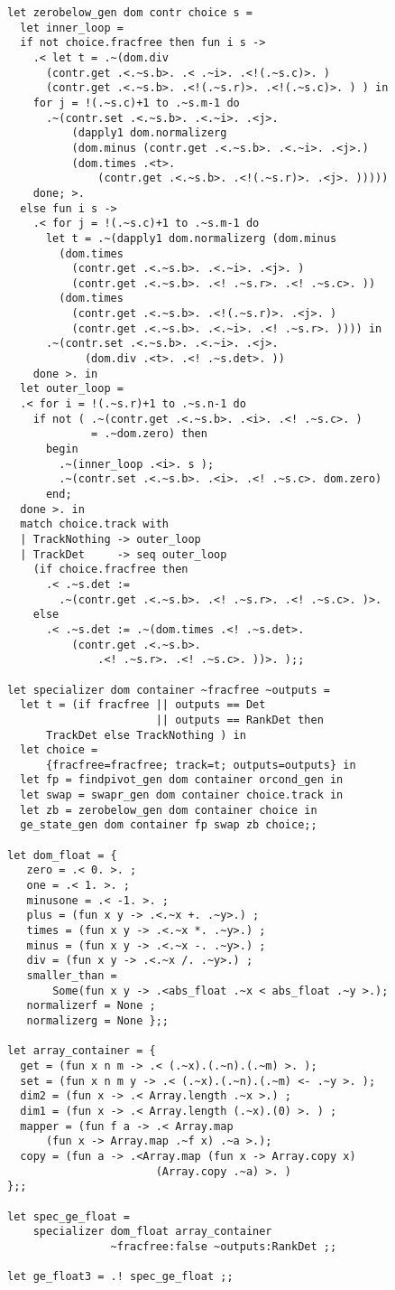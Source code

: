 \documentclass[11pt]{elsart}
\begin{document}
\begin{small}
\begin{verbatim}
let zerobelow_gen dom contr choice s =
  let inner_loop = 
  if not choice.fracfree then fun i s ->
    .< let t = .~(dom.div 
      (contr.get .<.~s.b>. .< .~i>. .<!(.~s.c)>. )
      (contr.get .<.~s.b>. .<!(.~s.r)>. .<!(.~s.c)>. ) ) in
    for j = !(.~s.c)+1 to .~s.m-1 do
      .~(contr.set .<.~s.b>. .<.~i>. .<j>. 
          (dapply1 dom.normalizerg 
          (dom.minus (contr.get .<.~s.b>. .<.~i>. .<j>.)
          (dom.times .<t>. 
              (contr.get .<.~s.b>. .<!(.~s.r)>. .<j>. )))))
    done; >.
  else fun i s -> 
    .< for j = !(.~s.c)+1 to .~s.m-1 do
      let t = .~(dapply1 dom.normalizerg (dom.minus 
        (dom.times 
          (contr.get .<.~s.b>. .<.~i>. .<j>. )
          (contr.get .<.~s.b>. .<! .~s.r>. .<! .~s.c>. ))
        (dom.times 
          (contr.get .<.~s.b>. .<!(.~s.r)>. .<j>. )
          (contr.get .<.~s.b>. .<.~i>. .<! .~s.r>. )))) in
      .~(contr.set .<.~s.b>. .<.~i>. .<j>. 
            (dom.div .<t>. .<! .~s.det>. ))
    done >. in
  let outer_loop =
  .< for i = !(.~s.r)+1 to .~s.n-1 do
    if not ( .~(contr.get .<.~s.b>. .<i>. .<! .~s.c>. ) 
             = .~dom.zero) then
      begin
        .~(inner_loop .<i>. s );
        .~(contr.set .<.~s.b>. .<i>. .<! .~s.c>. dom.zero)
      end;
  done >. in
  match choice.track with
  | TrackNothing -> outer_loop
  | TrackDet     -> seq outer_loop
    (if choice.fracfree then
      .< .~s.det := 
        .~(contr.get .<.~s.b>. .<! .~s.r>. .<! .~s.c>. )>.
    else
      .< .~s.det := .~(dom.times .<! .~s.det>. 
          (contr.get .<.~s.b>.
              .<! .~s.r>. .<! .~s.c>. ))>. );;

let specializer dom container ~fracfree ~outputs =
  let t = (if fracfree || outputs == Det 
                       || outputs == RankDet then 
      TrackDet else TrackNothing ) in
  let choice = 
      {fracfree=fracfree; track=t; outputs=outputs} in
  let fp = findpivot_gen dom container orcond_gen in
  let swap = swapr_gen dom container choice.track in
  let zb = zerobelow_gen dom container choice in
  ge_state_gen dom container fp swap zb choice;;

let dom_float = { 
   zero = .< 0. >. ; 
   one = .< 1. >. ;
   minusone = .< -1. >. ;
   plus = (fun x y -> .<.~x +. .~y>.) ;
   times = (fun x y -> .<.~x *. .~y>.) ;
   minus = (fun x y -> .<.~x -. .~y>.) ;
   div = (fun x y -> .<.~x /. .~y>.) ;
   smaller_than = 
       Some(fun x y -> .<abs_float .~x < abs_float .~y >.);
   normalizerf = None ;
   normalizerg = None };;

let array_container = {
  get = (fun x n m -> .< (.~x).(.~n).(.~m) >. );
  set = (fun x n m y -> .< (.~x).(.~n).(.~m) <- .~y >. );
  dim2 = (fun x -> .< Array.length .~x >.) ;
  dim1 = (fun x -> .< Array.length (.~x).(0) >. ) ;
  mapper = (fun f a -> .< Array.map 
      (fun x -> Array.map .~f x) .~a >.);
  copy = (fun a -> .<Array.map (fun x -> Array.copy x) 
                       (Array.copy .~a) >. )
};;

let spec_ge_float = 
    specializer dom_float array_container 
                ~fracfree:false ~outputs:RankDet ;;

let ge_float3 = .! spec_ge_float ;;
\end{verbatim}
\end{small}
\end{document}
